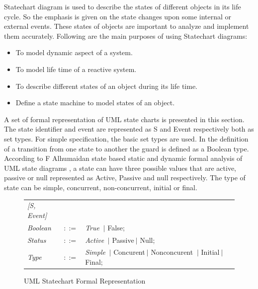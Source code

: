 Statechart diagram is used to describe the states of different objects in its life cycle. So the emphasis is given on the state changes upon some internal or external events. These states of objects are important to analyze and implement them accurately. Following are the main purposes of using Statechart diagrams:

\begin{itemize}
	\item To model dynamic aspect of a system.
	
	\item To model life time of a reactive system.
	
	\item To describe different states of an object during its life time.
	
	\item Define a state machine to model states of an object.
\end{itemize}

A set of formal representation of UML state charts is presented in this section. The state identifier and event are represented as S and Event respectively both as set types. For simple specification, the basic set types are used. In the definition of a transition from one state to another the guard is defined as a Boolean type. According to F Alhumaidan state based static and dynamic formal analysis of UML state diagrams \cite{ref_16_alhumaidan2012state} , a state can have three possible values that are active, passive or null represented as Active, Passive and null respectively. The type of state can be simple, concurrent, non-concurrent, initial or final.

\begin{figure}[ht!]
	\centering
	\begin{tabular}{lll}
		\footnotesize                       
		\textit{[S, Event]}          &\footnotesize \\
		
		\footnotesize
		\textit{Boolean}            &\footnotesize $::=$         &\footnotesize \textit{True} $\ \vert $ {False};       \\   
		\footnotesize
		\textit{Status}            &\footnotesize $::=$         &\footnotesize \textit{Active}
		 $\ \vert $ {Passive}$\ \vert $ {Null};       \\ 
		\footnotesize
		\textit{Type}            &\footnotesize $::=$         &\footnotesize \textit{Simple}
		 	$\ \vert $ {Concurent}$\ \vert $ {Nonconcurent} $\ \vert $ {Initial}$\ \vert $ {Final};       \\	 	 
		
	\end{tabular}
	\caption{UML Statechart Formal Representation}
	\label{statechart_formal_representation}
\end{figure}

